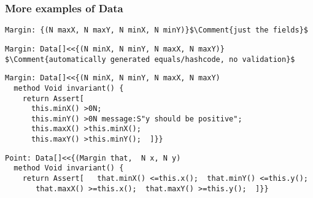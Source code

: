 \begin{frame}[fragile]
\frametitle{More examples of Data}
\begin{NiceCode}{59ex}{0.8}
\begin{lstlisting}
Margin: {(N maxX, N maxY, N minX, N minY)}$\Comment{just the fields}$
\end{lstlisting}
\end{NiceCode}
\pause
\begin{NiceCode}{59ex}{0.8}
\begin{lstlisting}
Margin: Data[]<<{(N minX, N minY, N maxX, N maxY)}
$\Comment{automatically generated equals/hashcode, no validation}$
\end{lstlisting}
\end{NiceCode}
\begin{NiceCode}{59ex}{0.8}
\begin{lstlisting}
Margin: Data[]<<{(N minX, N minY, N maxX, N maxY)
  method Void invariant() {
    return Assert[
      this.minX() >0N;
      this.minY() >0N message:S"y should be positive";
      this.maxX() >this.minX();
      this.maxY() >this.minY();  ]}}
\end{lstlisting}
\end{NiceCode}
\begin{NiceCode}{59ex}{0.8}
\begin{lstlisting}
Point: Data[]<<{(Margin that,  N x, N y)
  method Void invariant() {
    return Assert[   that.minX() <=this.x();  that.minY() <=this.y();
       that.maxX() >=this.x();  that.maxY() >=this.y();  ]}}
\end{lstlisting}
\end{NiceCode}

\end{frame}



